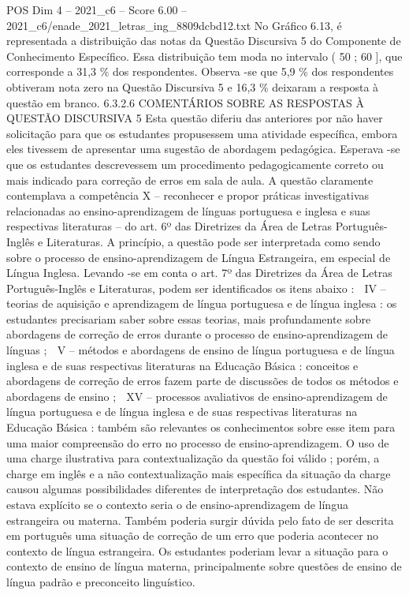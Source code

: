 \begin{textsample}{POS Dim 4 – 2021\_c6 – Score 6.00 – 2021\_c6/enade\_2021\_letras\_ing\_8809dcbd12.txt}
No Gráfico 6.13, é representada a distribuição das notas da Questão Discursiva 5 do Componente de Conhecimento Específico.
Essa distribuição tem moda no intervalo ( 50 ; 60 ], que corresponde a 31,3 \% dos respondentes.
Observa -se que 5,9 \% dos respondentes obtiveram nota zero na Questão Discursiva 5 e 16,3 \% deixaram a resposta à questão em branco. 6.3.2.6 COMENTÁRIOS SOBRE AS RESPOSTAS À QUESTÃO DISCURSIVA 5 Esta questão diferiu das anteriores por não haver solicitação para que os estudantes propusessem uma atividade específica, embora eles tivessem de apresentar uma sugestão de abordagem pedagógica.
Esperava -se que os estudantes descrevessem um procedimento pedagogicamente correto ou mais indicado para correção de erros em sala de aula.
A questão claramente contemplava a competência X – reconhecer e propor práticas investigativas relacionadas ao ensino-aprendizagem de línguas portuguesa e inglesa e suas respectivas literaturas – do art. 6º das Diretrizes da Área de Letras Português-Inglês e Literaturas.
A princípio, a questão pode ser interpretada como sendo sobre o processo de ensino-aprendizagem de Língua Estrangeira, em especial de Língua Inglesa.
Levando -se em conta o art. 7º das Diretrizes da Área de Letras Português-Inglês e Literaturas, podem ser identificados os itens abaixo :  IV – teorias de aquisição e aprendizagem de língua portuguesa e de língua inglesa : os estudantes precisariam saber sobre essas teorias, mais profundamente sobre abordagens de correção de erros durante o processo de ensino-aprendizagem de línguas ;  V – métodos e abordagens de ensino de língua portuguesa e de língua inglesa e de suas respectivas literaturas na Educação Básica : conceitos e abordagens de correção de erros fazem parte de discussões de todos os métodos e abordagens de ensino ;  XV – processos avaliativos de ensino-aprendizagem de língua portuguesa e de língua inglesa e de suas respectivas literaturas na Educação Básica : também são relevantes os conhecimentos sobre esse item para uma maior compreensão do erro no processo de ensino-aprendizagem.
O uso de uma charge ilustrativa para contextualização da questão foi válido ; porém, a charge em inglês e a não contextualização mais específica da situação da charge causou algumas possibilidades diferentes de interpretação dos estudantes.
Não estava explícito se o contexto seria o de ensino-aprendizagem de língua estrangeira ou materna.
Também poderia surgir dúvida pelo fato de ser descrita em português uma situação de correção de um erro que poderia acontecer no contexto de língua estrangeira.
Os estudantes poderiam levar a situação para o contexto de ensino de língua materna, principalmente sobre questões de ensino de língua padrão e preconceito linguístico.

\end{textsample}

